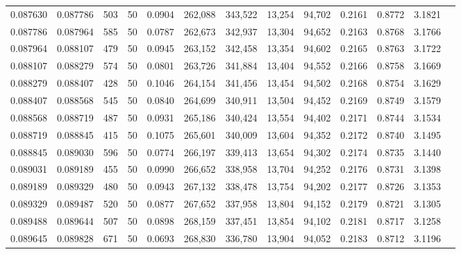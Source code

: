 \begin{tabular}{rrrrrrrrrrrrr}
0.087630 & 0.087786 &   503 &  50 &                                     0.0904 & 262,088 & 343,522 &  13,254 &  94,702 & 0.2161 & 0.8772 & 3.1821 \\
0.087786 & 0.087964 &   585 &  50 &                                     0.0787 & 262,673 & 342,937 &  13,304 &  94,652 & 0.2163 & 0.8768 & 3.1766 \\
0.087964 & 0.088107 &   479 &  50 &                                     0.0945 & 263,152 & 342,458 &  13,354 &  94,602 & 0.2165 & 0.8763 & 3.1722 \\
0.088107 & 0.088279 &   574 &  50 &                                     0.0801 & 263,726 & 341,884 &  13,404 &  94,552 & 0.2166 & 0.8758 & 3.1669 \\
0.088279 & 0.088407 &   428 &  50 &                                     0.1046 & 264,154 & 341,456 &  13,454 &  94,502 & 0.2168 & 0.8754 & 3.1629 \\
0.088407 & 0.088568 &   545 &  50 &                                     0.0840 & 264,699 & 340,911 &  13,504 &  94,452 & 0.2169 & 0.8749 & 3.1579 \\
0.088568 & 0.088719 &   487 &  50 &                                     0.0931 & 265,186 & 340,424 &  13,554 &  94,402 & 0.2171 & 0.8744 & 3.1534 \\
0.088719 & 0.088845 &   415 &  50 &                                     0.1075 & 265,601 & 340,009 &  13,604 &  94,352 & 0.2172 & 0.8740 & 3.1495 \\
0.088845 & 0.089030 &   596 &  50 &                                     0.0774 & 266,197 & 339,413 &  13,654 &  94,302 & 0.2174 & 0.8735 & 3.1440 \\
0.089031 & 0.089189 &   455 &  50 &                                     0.0990 & 266,652 & 338,958 &  13,704 &  94,252 & 0.2176 & 0.8731 & 3.1398 \\
0.089189 & 0.089329 &   480 &  50 &                                     0.0943 & 267,132 & 338,478 &  13,754 &  94,202 & 0.2177 & 0.8726 & 3.1353 \\
0.089329 & 0.089487 &   520 &  50 &                                     0.0877 & 267,652 & 337,958 &  13,804 &  94,152 & 0.2179 & 0.8721 & 3.1305 \\
0.089488 & 0.089644 &   507 &  50 &                                     0.0898 & 268,159 & 337,451 &  13,854 &  94,102 & 0.2181 & 0.8717 & 3.1258 \\
0.089645 & 0.089828 &   671 &  50 &                                     0.0693 & 268,830 & 336,780 &  13,904 &  94,052 & 0.2183 & 0.8712 & 3.1196 \\

\end{tabular}
